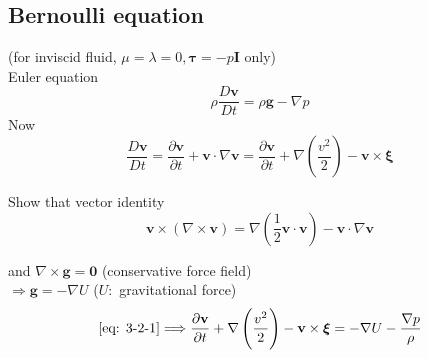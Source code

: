 \subsection{Bernoulli equation}
(for inviscid fluid, $\mu = \lambda = 0,\boldsymbol{\tau} = - p\mathbf{I}$ only)\\
Euler equation 
\begin{equation}
\rho\frac{D\mathbf{v}}{Dt} = \rho\mathbf{g} - \nabla p
\label{eq: 3-2-1}
\end{equation}
Now
\[
\frac{D\mathbf{v}}{Dt} = \frac{\partial\mathbf{v}}{\partial t} + \mathbf{v}\cdot\nabla\mathbf{v} = \frac{\partial\mathbf{v}}{\partial t} + \nabla\left(\frac{v^2}{2}\right) - \mathbf{v}\times\boldsymbol{\xi}
\]
\begin{exercise}
Show that vector identity
\[
\mathbf{v}\times\left(\nabla\times\mathbf{v}\right) = \nabla\left(\frac{1}{2}\mathbf{v}\cdot\mathbf{v}\right)- \mathbf{v}\cdot\nabla\mathbf{v} 
\]
\end{exercise}
and $\nabla\times\mathbf{g} = \mathbf{0}$ (conservative force field)\\
$\Longrightarrow\mathbf{g} = -\nabla U$ ($U\colon$ gravitational force)\\
\begin{equation}
\eqref{eq: 3-2-1}\Longrightarrow
\frac{\partial\mathbf{v}}{\partial t} + \nabla\left(\frac{v^2}{2}\right) - \mathbf{v}\times\boldsymbol{\xi} = -\nabla U - \frac{\nabla p}{\rho}
\label{eq: 3-2-2}
\end{equation}

